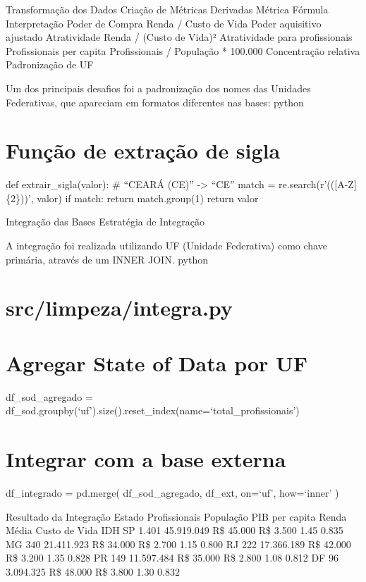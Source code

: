 \documentclass[
  11pt,
  letterpaper,
  DIV=11,
  numbers=noendperiod]{scrartcl}
\begin{document}
Transformação dos Dados Criação de Métricas Derivadas Métrica Fórmula
Interpretação Poder de Compra Renda / Custo de Vida Poder aquisitivo
ajustado Atratividade Renda / (Custo de Vida)² Atratividade para
profissionais Profissionais per capita Profissionais / População *
100.000 Concentração relativa Padronização de UF

Um dos principais desafios foi a padronização dos nomes das Unidades
Federativas, que apareciam em formatos diferentes nas bases: python

\section{Função de extração de
sigla}\label{funuxe7uxe3o-de-extrauxe7uxe3o-de-sigla}

def extrair\_sigla(valor): \# ``CEARÁ (CE)'' -\textgreater{} ``CE''
match = re.search(r'(({[}A-Z{]}\{2\}))', valor) if match: return
match.group(1) return valor

Integração das Bases Estratégia de Integração

A integração foi realizada utilizando UF (Unidade Federativa) como chave
primária, através de um INNER JOIN. python

\section{src/limpeza/integra.py}\label{srclimpezaintegra.py}

\section{Agregar State of Data por
UF}\label{agregar-state-of-data-por-uf}

df\_sod\_agregado =
df\_sod.groupby(`uf').size().reset\_index(name=`total\_profissionais')

\section{Integrar com a base externa}\label{integrar-com-a-base-externa}

df\_integrado = pd.merge( df\_sod\_agregado, df\_ext, on=`uf',
how=`inner' )

Resultado da Integração Estado Profissionais População PIB per capita
Renda Média Custo de Vida IDH SP 1.401 45.919.049 R\$ 45.000 R\$ 3.500
1.45 0.835 MG 340 21.411.923 R\$ 34.000 R\$ 2.700 1.15 0.800 RJ 222
17.366.189 R\$ 42.000 R\$ 3.200 1.35 0.828 PR 149 11.597.484 R\$ 35.000
R\$ 2.800 1.08 0.812 DF 96 3.094.325 R\$ 48.000 R\$ 3.800 1.30 0.832
\end{document}
